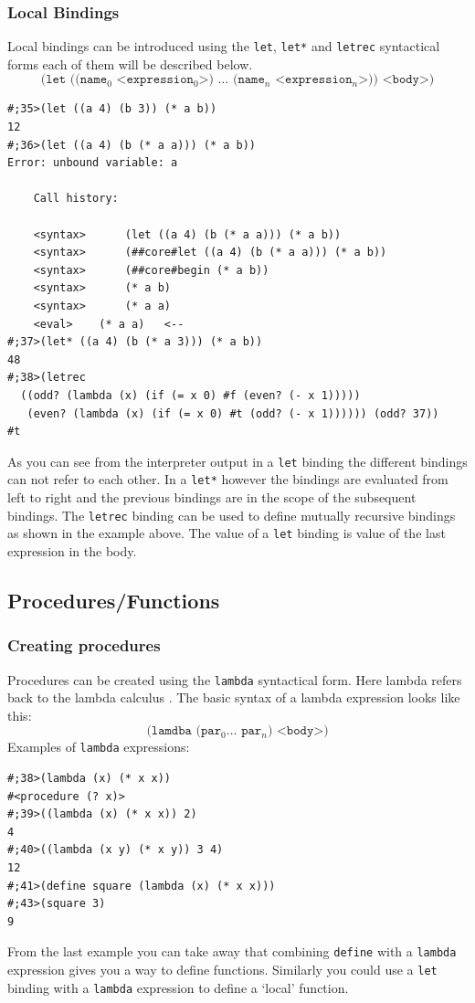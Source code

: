 \documentclass[12pt,a4paper,english,twoside]{article}
\begin{document}
\subsubsection{Local Bindings}
Local bindings can be introduced using the \texttt{let}, \texttt{let*} and 
\texttt{letrec} syntactical forms each of them will be described below.
\begin{equation*}
\texttt{(let ((name$_{0}$ <expression$_{0}$>) $\dots$ (name$_{n}$ 
<expression$_{n}$>)) <body>)}
\end{equation*}
\begin{lstlisting}
#;35>(let ((a 4) (b 3)) (* a b))
12
#;36>(let ((a 4) (b (* a a))) (* a b)) 
Error: unbound variable: a

    Call history:

    <syntax>	  (let ((a 4) (b (* a a))) (* a b))
    <syntax>	  (##core#let ((a 4) (b (* a a))) (* a b))
    <syntax>	  (##core#begin (* a b))
    <syntax>	  (* a b)
    <syntax>	  (* a a)
    <eval>	  (* a a)	<--
#;37>(let* ((a 4) (b (* a 3))) (* a b))
48
#;38>(letrec
  ((odd? (lambda (x) (if (= x 0) #f (even? (- x 1)))))
   (even? (lambda (x) (if (= x 0) #t (odd? (- x 1)))))) (odd? 37))
#t
\end{lstlisting}
As you can see from the interpreter output in a \texttt{let} binding the 
different bindings can not refer to each other. In a \texttt{let*} however the 
bindings are evaluated from left to right and the previous bindings are in the 
scope of the subsequent bindings. The \texttt{letrec} binding can be used to 
define mutually recursive bindings as shown in the example above. The value of 
a \texttt{let} binding is value of the last expression in the body. 

\subsection{Procedures/Functions}
\subsubsection{Creating procedures}
Procedures can be created using the \texttt{lambda} syntactical form. Here 
lambda refers back to the lambda calculus \cite{lambda}.
The basic syntax of a lambda expression looks like this:
\begin{equation*}
\texttt{(lamdba (par$_{0} \dots$ par$_{n}$) <body>)}
\end{equation*}
Examples of \texttt{lambda} expressions:
\begin{lstlisting}
#;38>(lambda (x) (* x x))
#<procedure (? x)>
#;39>((lambda (x) (* x x)) 2)
4 
#;40>((lambda (x y) (* x y)) 3 4)
12
#;41>(define square (lambda (x) (* x x)))
#;43>(square 3)
9
\end{lstlisting}
From the last example you can take away that combining \texttt{define} with a 
\texttt{lambda} expression gives you a way to define functions. Similarly you 
could use a \texttt{let} binding with a \texttt{lambda} expression to define a 
`local' function.
\end{document}
